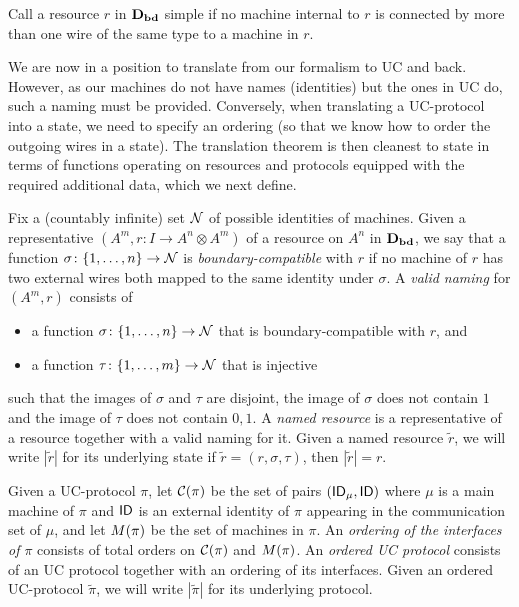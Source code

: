 \begin{definition}
Call a resource $r$ in $\mathbf{D_{bd}}$ simple if no machine internal to $r$ is connected by more than one wire of the same type to a machine in $r$. 
\end{definition}

We are now in a position to translate from our formalism to UC and back. However, as our machines do not have names (identities) but the ones in UC do, such a naming must be provided.  Conversely, when translating a UC-protocol into a state, we need to specify an ordering (so that we know how to order the outgoing wires in a state). The translation theorem is then cleanest to state in terms of functions operating on resources and protocols equipped with the required additional data, which we next define. 
 
\begin{definition}\label{def:translationdata} Fix a (countably infinite) set  $\mathcal{N}$ of possible identities of machines. Given a representative $(A^m, r \colon I\to A^n \otimes A^m)$ of a resource on  $A^n$ in $\mathbf{D_{bd}}$, we say that a function $\sigma \colon \{1, \dots , n\}\to \mathcal{N}$ is \emph{boundary-compatible} with $r$ if no machine of $r$ has two  external wires both mapped to the same identity under $\sigma$. A \emph{valid naming} for $(A^m,r)$ consists of 
\begin{itemize}
    \item a function  $\sigma \colon \{1, \dots , n\}\to \mathcal{N} $  that is boundary-compatible with $r$, and 
    \item a function $\tau \colon \{1,\dots ,m\}\to\mathcal{N}$ that is injective
\end{itemize}
such that the images of $\sigma$ and $\tau$ are disjoint, the image of $\sigma$ does not contain $1$ and the image of $\tau$ does not contain $0,1$. A \emph{named resource} is a representative of a resource together with a valid naming for it. Given a named resource $\tilde{r}$, we will write $\left\vert \tilde{r}\right\vert$ for its underlying state \ie if $\tilde{r} = (r, \sigma, \tau)$, then $\left\vert \tilde{r}\right\vert= r$.

Given a UC-protocol $\pi$, let $\mathcal{C}(\pi)$ be the set of 
pairs $(\mathsf{ID}_\mu,\mathsf{ID})$ where $\mu$ is a main machine of $\pi$ and $\mathsf{ID}$ is an external identity of $\pi$ appearing in the communication set of $\mu$, and let $M (\pi)$ be the set of machines in $\pi$. An \emph{ordering of the interfaces of $\pi$} consists of total orders on $\mathcal{C}(\pi)$ and $M(\pi)$. An \emph{ordered UC protocol} consists of an UC protocol together with an ordering of its interfaces. Given an ordered UC-protocol $\tilde{\pi}$, we will write $\left\vert\tilde{\pi}\right\vert$ for its underlying protocol. 
\end{definition}


